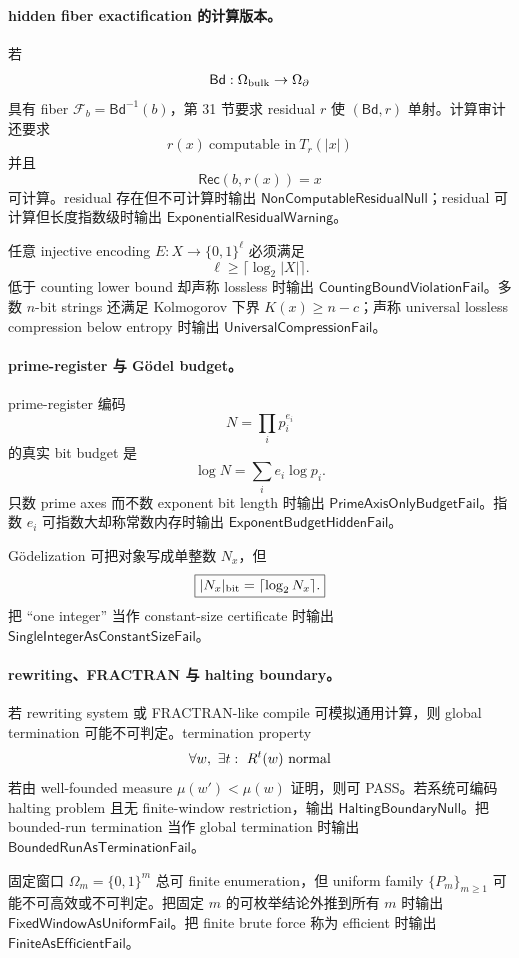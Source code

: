 \paragraph{hidden fiber exactification 的计算版本。}
若
\[
\mathsf{Bd}:\Omega_{\rm bulk}\to\Omega_\partial
\]
具有 fiber \(\mathcal F_b=\mathsf{Bd}^{-1}(b)\)，第 31 节要求 residual \(r\) 使 \((\mathsf{Bd},r)\) 单射。计算审计还要求
\[
\boxed{
r(x)\ \text{computable in}\ T_r(|x|)
}
\]
并且
\[
\boxed{
\mathsf{Rec}(b,r(x))=x
}
\]
可计算。residual 存在但不可计算时输出 \(\mathsf{NonComputableResidualNull}\)；residual 可计算但长度指数级时输出 \(\mathsf{ExponentialResidualWarning}\)。

任意 injective encoding \(E:X\to\{0,1\}^{\ell}\) 必须满足
\[
\boxed{
\ell\ge\lceil\log_2|X|\rceil.
}
\]
低于 counting lower bound 却声称 lossless 时输出 \(\mathsf{CountingBoundViolationFail}\)。多数 \(n\)-bit strings 还满足 Kolmogorov 下界 \(K(x)\ge n-c\)；声称 universal lossless compression below entropy 时输出 \(\mathsf{UniversalCompressionFail}\)。

\paragraph{prime-register 与 Gödel budget。}
prime-register 编码
\[
N=\prod_i p_i^{e_i}
\]
的真实 bit budget 是
\[
\boxed{
\log N=\sum_i e_i\log p_i.
}
\]
只数 prime axes 而不数 exponent bit length 时输出 \(\mathsf{PrimeAxisOnlyBudgetFail}\)。指数 \(e_i\) 可指数大却称常数内存时输出 \(\mathsf{ExponentBudgetHiddenFail}\)。

Gödelization 可把对象写成单整数 \(N_x\)，但
\[
\boxed{
|N_x|_{\rm bit}=\lceil\log_2N_x\rceil.
}
\]
把 ``one integer'' 当作 constant-size certificate 时输出 \(\mathsf{SingleIntegerAsConstantSizeFail}\)。

\paragraph{rewriting、FRACTRAN 与 halting boundary。}
若 rewriting system 或 FRACTRAN-like compile 可模拟通用计算，则 global termination 可能不可判定。termination property
\[
\forall w,\ \exists t:\ R^t(w)\ {\rm normal}
\]
若由 well-founded measure \(\mu(w')<\mu(w)\) 证明，则可 PASS。若系统可编码 halting problem 且无 finite-window restriction，输出 \(\mathsf{HaltingBoundaryNull}\)。把 bounded-run termination 当作 global termination 时输出 \(\mathsf{BoundedRunAsTerminationFail}\)。

固定窗口 \(\Omega_m=\{0,1\}^m\) 总可 finite enumeration，但 uniform family \(\{P_m\}_{m\ge1}\) 可能不可高效或不可判定。把固定 \(m\) 的可枚举结论外推到所有 \(m\) 时输出 \(\mathsf{FixedWindowAsUniformFail}\)。把 finite brute force 称为 efficient 时输出 \(\mathsf{FiniteAsEfficientFail}\)。

